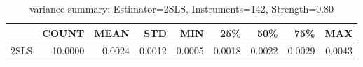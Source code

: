 \begin{table}[ht]
\centering
\caption{variance summary: Estimator=2SLS, Instruments=142, Strength=0.80}
\begin{tabular}{lrrrrrrrr}
\toprule
 & COUNT & MEAN & STD & MIN & 25\% & 50\% & 75\% & MAX \\
\midrule
2SLS & 10.0000 & 0.0024 & 0.0012 & 0.0005 & 0.0018 & 0.0022 & 0.0029 & 0.0043 \\
\bottomrule
\end{tabular}
\end{table}
